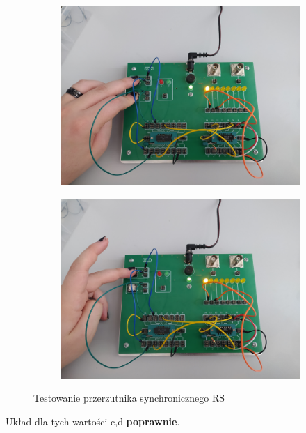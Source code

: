 \begin{itemize}
\begin{figure}[H]
\begin{subfigure}[H]{0.4\textwidth}
            \end{subfigure}
            \begin{subfigure}[H]{0.4\textwidth}
                \includegraphics[width=\textwidth]{img/synch_RS/1653500525408_scaled.png}
            \end{subfigure}
            \begin{subfigure}[H]{0.4\textwidth}
                \includegraphics[width=\textwidth]{img/synch_RS/1653500525398_scaled.png}
            \end{subfigure}
            \caption{Testowanie przerzutnika synchronicznego RS}
        \end{figure}

        Układ dla tych wartości c,d \textbf{poprawnie}.


\end{itemize}
